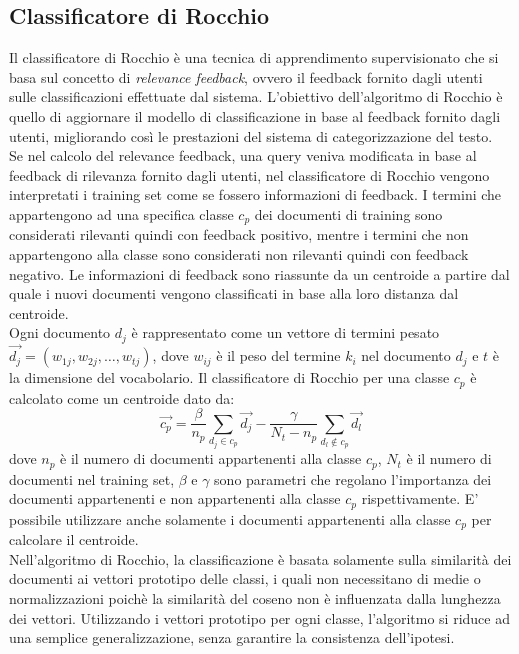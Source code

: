 \documentclass{report}
\begin{document}
	\subsection{Classificatore di Rocchio}
	Il classificatore di Rocchio è una tecnica di apprendimento supervisionato che si basa sul concetto di \textit{relevance feedback}, ovvero il feedback fornito dagli utenti sulle classificazioni effettuate dal sistema. L'obiettivo dell'algoritmo di Rocchio è quello di aggiornare il modello di classificazione in base al feedback fornito dagli utenti, migliorando così le prestazioni del sistema di categorizzazione del testo. 
	\vspace{\baselineskip}\\
	Se nel calcolo del relevance feedback, una query veniva modificata in base al feedback di rilevanza fornito dagli utenti, nel classificatore di Rocchio vengono interpretati i training set come se fossero informazioni di feedback. I termini che appartengono ad una specifica classe $c_p$ dei documenti di training sono considerati rilevanti quindi con feedback positivo, mentre i termini che non appartengono alla classe sono considerati non rilevanti quindi con feedback negativo. Le informazioni di feedback sono riassunte da un centroide a partire dal quale i nuovi documenti vengono classificati in base alla loro distanza dal centroide.
	\vspace{\baselineskip}\\
	Ogni documento $d_j$ è rappresentato come un vettore di termini pesato $\overrightarrow{d_j} = (w_{1j}, w_{2j}, \ldots, w_{tj})$, dove $w_{ij}$ è il peso del termine $k_i$ nel documento $d_j$ e $t$ è la dimensione del vocabolario. Il classificatore di Rocchio per una classe $c_p$ è calcolato come un centroide dato da:
	\[
		\overrightarrow{c_p} = \frac{\beta}{n_p} \sum_{d_j \in c_p} \overrightarrow{d_j} - \frac{\gamma}{N_t-n_p} \sum_{d_l \notin c_p} \overrightarrow{d_l}
	\]
	dove $n_p$ è il numero di documenti appartenenti alla classe $c_p$, $N_t$ è il numero di documenti nel training set, $\beta$ e $\gamma$ sono parametri che regolano l'importanza dei documenti appartenenti e non appartenenti alla classe $c_p$ rispettivamente.
	E' possibile utilizzare anche solamente i documenti appartenenti alla classe $c_p$ per calcolare il centroide.
	\vspace{\baselineskip}\\
	Nell'algoritmo di Rocchio, la classificazione è basata solamente sulla similarità dei documenti ai vettori prototipo delle classi, i quali non necessitano di medie o normalizzazioni poichè la similarità del coseno non è influenzata dalla lunghezza dei vettori. Utilizzando i vettori prototipo per ogni classe, l'algoritmo si riduce ad una semplice generalizzazione, senza garantire la consistenza dell'ipotesi.
\end{document}
